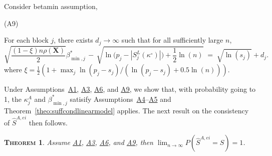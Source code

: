 \documentclass[
  12pt]{article}
\newcommand{\paul}[1]{{\small{\color{green} \sf $\spadesuit$ Paul: #1}}}
\newcommand{\bX}{\mathbf{X}}
\newtheorem{thm}{\textsc{Theorem}}[section]
\begin{document}

Consider betamin assumption,

\hypertarget{lab:A9}{(A9)}\quad For each block $j$, there exists $d_j\to \infty$ such that for  all sufficiently large $n$,
\begin{equation*}
        \sqrt{\frac{ (1-\xi)n\rho(\bX)}{2}}\beta_{\min,j}^* \,- \,\sqrt{\ln\big(p_j-|S^{L}_j(\kappa^{\circ})|\big)+\frac12\ln(n)} \;=\; \sqrt{\ln(s_j)} + d_j .
    \end{equation*}
where $\xi=\tfrac12(1+\max_j \ln(p_j-s_j)/(\ln(p_j-s_j)+0.5\ln(n)))$.

Under Assumptions~\hyperlink{lab:A1}{A1}, \hyperlink{lab:A3}{A3}, \hyperlink{lab:A6}{A6}, and \hyperlink{lab:A9}{A9}, we show that, with probability going to 1, the $\kappa^{A}_j$ and $\beta_{\min,j}^*$ satisify Assumptions~\hyperlink{lab:A4}{A4}--\hyperlink{lab:A5}{A5} and Theorem~\ref{theo:suffcondlinearmodel} applies. The next result on the consistency of $\hat{S}^{A,ei}$ then follows.
\begin{thm}\label{theo:informedl0consist}
    Assume \hyperlink{lab:A1}{A1}, \hyperlink{lab:A3}{A3}, \hyperlink{lab:A6}{A6}, and \hyperlink{lab:A9}{A9}, then 
$\lim_{n \to \infty} P(\hat{S}^{A,ei} = S) = 1$.
\end{thm}
\end{document}
